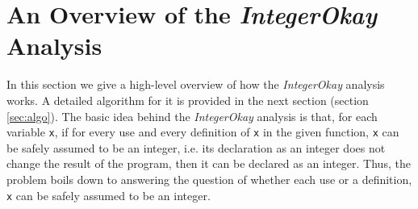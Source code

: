 \section{An Overview of the \emph{IntegerOkay} Analysis}
\label{sec:overview}

In this section we give a high-level overview of how the \emph{IntegerOkay}
analysis works. A detailed algorithm for it is provided in the next section
(section \ref{sec:algo}).
The basic idea behind the \emph{IntegerOkay} analysis is that, for each 
variable \verb|x|, if for every use and every definition of \verb|x| in the
given \matlab function, \verb|x| can be safely assumed to be an integer, i.e. its
declaration as an integer does not change the result of the program,
then it can be declared as an integer. Thus, the problem boils down to
answering the question of whether each use or a definition,
\verb|x| can be safely assumed to be an integer.

